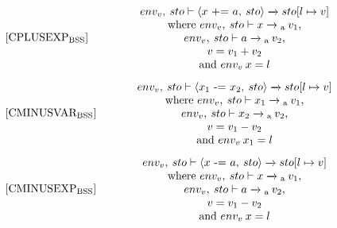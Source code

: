 \begin{equation}
\begin{minipage}{.2\linewidth}
$[\text{CPLUSEXP}_\text{BSS}]$
\end{minipage}
\begin{minipage}{.8\linewidth}
\centering
$env_v, \: sto \vdash \langle x \text{ += } a, \: sto \rangle \xrightarrow{} sto[l \mapsto v]$ 
\\
where $env_v, \: sto \vdash x \xrightarrow{}\textsubscript{a} \: v_1$,
\\
$env_v, \: sto \vdash a \xrightarrow{}\textsubscript{a} \: v_2$,
\\
$v = v_1 + v_2$
\\
and $env_v \: x = l$
\end{minipage}
\end{equation}

\begin{equation}
\begin{minipage}{.2\linewidth}
$[\text{CMINUSVAR}_\text{BSS}]$
\end{minipage}
\begin{minipage}{.8\linewidth}
\centering
$env_v, \: sto \vdash \langle x_1 \text{ -= } x_2, \: sto \rangle \xrightarrow{} sto[l \mapsto v]$
\\
where $env_v, \: sto \vdash x_1 \xrightarrow{}\textsubscript{a} \: v_1$,
\\
$env_v, \: sto \vdash x_2 \xrightarrow{}\textsubscript{a} \: v_2$,
\\
$v = v_1 - v_2$
\\
and $env_v \: x_1 = l$
\end{minipage}
\end{equation}

\begin{equation}
\begin{minipage}{.2\linewidth}
$[\text{CMINUSEXP}_\text{BSS}]$
\end{minipage}
\begin{minipage}{.8\linewidth}
\centering
$env_v, \: sto \vdash \langle x \text{ -= } a, \: sto \rangle \xrightarrow{} sto[l \mapsto v]$ 
\\
where $env_v, \: sto \vdash x \xrightarrow{}\textsubscript{a} \: v_1$,
\\
$env_v, \: sto \vdash a \xrightarrow{}\textsubscript{a} \: v_2$,
\\
$v = v_1 - v_2$
\\
and $env_v \: x = l$
\end{minipage}
\end{equation}


